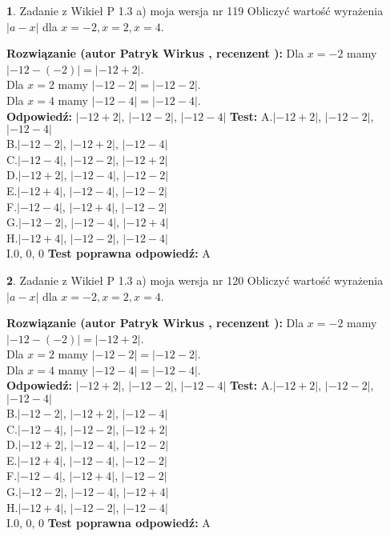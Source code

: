 \documentclass[12pt, a4paper]{article}
\theoremstyle{definition} %
\newtheorem{zad}{}
\newcommand{\zadStart}[1]{\begin{zad}#1\newline}
\newcommand{\zadStop}{\end{zad}}
\newcommand{\rozwStart}[2]{\noindent \textbf{Rozwiązanie (autor #1 , recenzent #2): }\newline}
\newcommand{\rozwStop}{\newline}
\newcommand{\odpStart}{\noindent \textbf{Odpowiedź:}\newline}
\newcommand{\odpStop}{\newline}
\newcommand{\testStart}{\noindent \textbf{Test:}\newline}
\newcommand{\testStop}{\newline}
\newcommand{\kluczStart}{\noindent \textbf{Test poprawna odpowiedź:}\newline}
\newcommand{\kluczStop}{\newline}
\begin{document}
\zadStart{Zadanie z Wikieł P 1.3 a) moja wersja nr 119}
Obliczyć wartość wyrażenia $|a - x|$ dla $x=-2,x=2,x=4$.
\zadStop
\rozwStart{Patryk Wirkus}{}
Dla $x = -2$ mamy $|-12 - (-2)| = |-12 + 2|$.\\
Dla $x = 2$ mamy $|-12 - 2| = |-12 - 2|$.\\
Dla $x = 4$ mamy $|-12 - 4| = |-12 - 4|$.\\
\rozwStop
\odpStart
$|-12 + 2|$, $|-12 - 2|$, $|-12 - 4|$
\odpStop
\testStart
A.$|-12 + 2|$, $|-12 - 2|$, $|-12 - 4|$\\
B.$|-12 - 2|$, $|-12 + 2|$, $|-12 - 4|$\\
C.$|-12 - 4|$, $|-12 - 2|$, $|-12 + 2|$\\
D.$|-12 + 2|$, $|-12 - 4|$, $|-12 - 2|$\\
E.$|-12 + 4|$, $|-12 - 4|$, $|-12 - 2|$\\
F.$|-12 - 4|$, $|-12 + 4|$, $|-12 - 2|$\\
G.$|-12 - 2|$, $|-12 - 4|$, $|-12 + 4|$\\
H.$|-12 + 4|$, $|-12 - 2|$, $|-12 - 4|$\\
I.$0$, $0$, $0$
\testStop
\kluczStart
A
\kluczStop



\zadStart{Zadanie z Wikieł P 1.3 a) moja wersja nr 120}
Obliczyć wartość wyrażenia $|a - x|$ dla $x=-2,x=2,x=4$.
\zadStop
\rozwStart{Patryk Wirkus}{}
Dla $x = -2$ mamy $|-12 - (-2)| = |-12 + 2|$.\\
Dla $x = 2$ mamy $|-12 - 2| = |-12 - 2|$.\\
Dla $x = 4$ mamy $|-12 - 4| = |-12 - 4|$.\\
\rozwStop
\odpStart
$|-12 + 2|$, $|-12 - 2|$, $|-12 - 4|$
\odpStop
\testStart
A.$|-12 + 2|$, $|-12 - 2|$, $|-12 - 4|$\\
B.$|-12 - 2|$, $|-12 + 2|$, $|-12 - 4|$\\
C.$|-12 - 4|$, $|-12 - 2|$, $|-12 + 2|$\\
D.$|-12 + 2|$, $|-12 - 4|$, $|-12 - 2|$\\
E.$|-12 + 4|$, $|-12 - 4|$, $|-12 - 2|$\\
F.$|-12 - 4|$, $|-12 + 4|$, $|-12 - 2|$\\
G.$|-12 - 2|$, $|-12 - 4|$, $|-12 + 4|$\\
H.$|-12 + 4|$, $|-12 - 2|$, $|-12 - 4|$\\
I.$0$, $0$, $0$
\testStop
\kluczStart
A
\kluczStop
\end{document}
